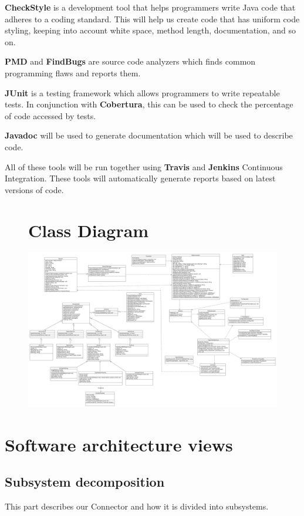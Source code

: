 \documentclass[a4paper]{article}
\begin{document}
\textbf{CheckStyle} is a development tool that helps programmers write Java code that adheres to a coding standard. This will help us create code that has uniform code styling, keeping into account white space, method length, documentation, and so on.

\textbf{PMD} and \textbf{FindBugs} are source code analyzers which finds common programming flaws and reports them.

\textbf{JUnit} is a testing framework which allows programmers to write repeatable tests. In conjunction with \textbf{Cobertura}, this can be used to  check the percentage of code accessed by tests.

\textbf{Javadoc} will be used to generate documentation which will be used to describe code. %

All of these tools will be run together using \textbf{Travis} and \textbf{Jenkins} Continuous Integration. These tools will automatically generate reports based on latest versions of code.

\noindent
\begin{figure}
\section{Class Diagram}
\includegraphics[width=1.0\textwidth]{class diagram.png}
\end{figure}

\clearpage

\section{Software architecture views}
\subsection{Subsystem decomposition}
This part describes our Connector and how it is divided into subsystems.
\end{document}
